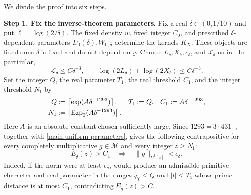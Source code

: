 \documentclass[twoside]{aomart}
\makeatletter
\theoremstyle{paperplain}
\theoremstyle{paperdefinition}
\renewenvironment{proof}[1][\proofname]{\par\pushQED{\qed}%
  \normalfont\topsep6\p@\@plus3\p@\relax\trivlist
  \item[\hskip\labelsep\itshape #1\@addpunct{.}]\ignorespaces
}{\popQED\endtrivlist\@endpefalse}
\numberwithin{equation}{section}
\makeatother
\begin{document}
\begin{proof}
We divide the proof into six steps.	
	
\par
\medskip
\noindent\textbf{Step 1. Fix the inverse-theorem parameters.}
Fix a real $\delta\in(0,1/10)$ and put $\ell=\log(2/\delta)$.  The
fixed density $w$, fixed integer $C_0$, and prescribed
$\delta$-dependent parameters $D_0(\delta),W_{0,\delta}$ determine the
kernels $K_X$.  These objects are fixed once $\delta$ is fixed and do not
depend on $g$.  Choose $L_\delta,X_\delta,\epsilon_\delta$, and
$\mathcal L_\delta$ as in .  In particular,
\begin{equation}
 \mathcal L_\delta\le C\delta^{-3},\qquad
 \log(2L_\delta)+\log(2X_\delta)\le C\delta^{-3}.
 \label{main:uniform-parameters}
\end{equation}
Set the integer $Q$, the real parameter $T_1$, the real threshold $C_1$,
and the integer threshold $N_1$ by
\begin{align*}
 Q&:=\left\lceil\exp(A\delta^{-1293})\right\rceil,
 &T_1&:=Q,
 &C_1&:=A\delta^{-1293},
 \notag\\
 N_1&:=\left\lceil\operatorname{Exp}_2(A\delta^{-1293})\right\rceil.
\end{align*}
Here $A$ is an absolute constant chosen sufficiently large.  Since
$1293=3\cdot431$, , together with
\eqref{main:uniform-parameters}, gives the following contrapositive for
 every completely multiplicative $g\in\mathcal M$ and every integer
$z\ge N_1$:
\begin{equation}
 E_g(z)>C_1\quad\Longrightarrow\quad
 \|g\|_{U^3[z]}<\epsilon_\delta.
 \label{main:inverse-contrapositive}
\end{equation}
Indeed, if the norm were at least $\epsilon_\delta$,
 would produce an admissible primitive
character and real parameter in the
ranges $q_\chi\le Q$ and $|t|\le T_1$ whose prime distance is at most
$C_1$, contradicting $E_g(z)>C_1$.


\end{proof}
\end{document}
